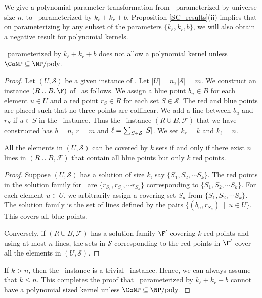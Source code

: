 We give a polynomial parameter transformation from \SC\ parameterized by universe size $n$, to \slrbsc\ parameterized by $k_\ell+k_r+b$. Proposition \ref{SC_results}(ii) implies that on parameterizing by any subset of the parameters $\{k_\ell,k_r,b\}$, we will also obtain a negative result for polynomial kernels.


\begin{thmk}\label{set_cover_redn}
 \slrbsc\ parameterized by $k_\ell+k_r+b$ does not allow a polynomial kernel unless $\CoNP\subseteq \NP/\mbox{poly}$.
\end{thmk}
 
\begin{proof}
 
 Let $(U,\mathcal{S})$ be a given instance of \SC. Let $\vert U \vert =n, \vert {\mathcal S} \vert =m$. We construct an instance $(R \cup B,\F)$ of \slrbsc\ as follows. We assign a blue point $b_u \in B$ for each element $u \in U$ and a red point $r_S \in R$ for each set $S \in \mathcal{S}$. The red and blue points are placed such that no three points are collinear. We add a line between $b_u$ and $r_S$ if $u \in S$ in the \SC\ instance. Thus the \slrbsc\ instance $(R\cup B,\mathcal{F})$ that we have constructed has $b =n$, $r=m$ and $\ell =\sum_{S\in {\cal S}} |S|$. We set $k_r = k$ and $k_\ell=n$.
 
 \begin{claim}
  All the elements in $(U,\mathcal{S})$ can be covered by $k$ sets if and only if there exist $n$ lines in $(R\cup B,\mathcal{F})$ that contain all blue points but only $k$ red points.
 \end{claim}
\begin{proof}
 Suppose $(U,\mathcal{S})$ has a solution of size $k$, say $\{S_1,S_2,\cdots S_k\}$. The red points in the solution family for \slrbsc\ are $\{r_{S_1},r_{S_2},\cdots r_{S_k}\}$  corresponding to $\{S_1,S_2,\cdots S_k\}$. For each element $u \in U$, we arbitrarily assign a covering set $S_u$ from $\{S_1,S_2,\cdots S_k\}$. The solution family is the set of lines defined by the pairs 
 $\{(b_u, r_{S_u})~\mid ~ u \in U\}$. This covers all blue points.

 Conversely, if $(R\cup B,\mathcal{F})$ has a solution family $\F'$ covering $k$ red points and using at most $n$ lines, the sets in $\mathcal{S}$ corresponding to the red points in $\F'$ cover all the elements in $(U,\mathcal{S})$.
\end{proof}
If $k > n$, then the \SC\ instance is a trivial \YES\ instance. Hence, we can always assume that $k \leq n$.
This completes the proof that \slrbsc\ parameterized by $k_\ell+k_r+ b$ cannot have a polynomial sized kernel unless $\CoNP\subseteq \NP/\mbox{poly}$.
\end{proof}


